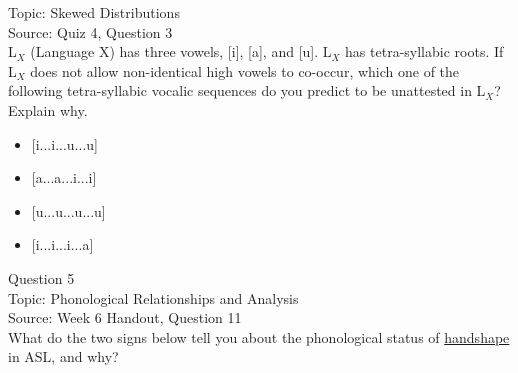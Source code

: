 \documentclass[12pt]{article}
\begin{document}
Topic: Skewed Distributions\\
Source: Quiz 4, Question 3\\

L$_X$ (Language X) has three vowels, [i], [a], and [u]. L$_X$ has tetra-syllabic roots. If L$_X$ does not allow non-identical high vowels to co-occur, which one of the following tetra-syllabic vocalic sequences do you predict to be unattested in L$_X$? Explain why.\\

\begin{itemize} \item {[i...i...u...u]} \item {[a...a...i...i]} \item {[u...u...u...u]} \item {[i...i...i...a]} \end{itemize}


\newpage

{\large Question 5}\\

Topic: Phonological Relationships and Analysis\\
Source: Week 6 Handout, Question 11\\

What do the two signs below tell you about the phonological status of \underline{handshape} in ASL, and why?\\
\end{document}
